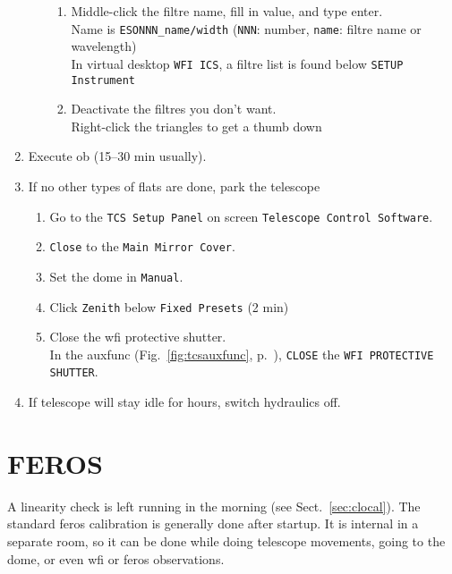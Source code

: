 \documentclass[11pt,fleqn]{book}
\def\figref#1{Fig.~\ref{fig:#1}, p.~\pageref{fig:#1}}
\begin{document}
\begin{enumerate}
\begin{enumerate}
\begin{enumerate}
                 \item Middle-click the filtre name, fill in value, and type enter.\\
                       Name is \texttt{ESONNN\_name/width} (\texttt{NNN}: number, \texttt{name}: filtre name or wavelength)\\
                       In virtual desktop \texttt{WFI ICS}, a filtre list is found below \texttt{SETUP Instrument}
                 \item Deactivate the filtres you don't want.\\
                       Right-click the triangles to get a thumb down
              \end{enumerate}       
     \end{enumerate}
     \item Execute \gls{ob} (15--30 min usually).
     \item If no other types of flats are done, park the telescope 
     \begin{enumerate}
         \item Go to the \texttt{TCS Setup Panel} on screen \texttt{Telescope Control Software}.
         \item \texttt{Close} to the \texttt{Main Mirror Cover}.
         \item Set the dome in \texttt{Manual}.
         \item Click \texttt{Zenith} below \texttt{Fixed Presets} (2 min)
         \item Close the \gls{wfi} protective shutter.\\
           In the \gls{auxfunc} (\figref{tcsauxfunc}), \texttt{CLOSE} the \texttt{WFI PROTECTIVE SHUTTER}.
     \end{enumerate}
     \item If telescope will stay idle for hours, switch hydraulics off.
   \end{enumerate}



\section{FEROS}

A linearity check is left running in the morning (see Sect.~\ref{sec:clocal}). The standard \gls{feros} calibration is generally done after startup.  It is internal in a separate room, so it can be done while doing telescope movements, going to the dome, or even \gls{wfi} or \gls{feros} observations.
\end{document}
